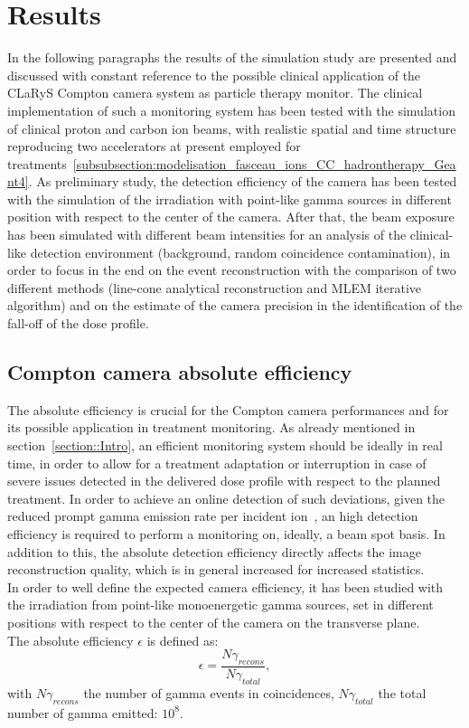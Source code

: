 \section{Results}
In the following paragraphs the results of the simulation study are presented and discussed with constant reference to the possible clinical application of the CLaRyS Compton camera system as particle therapy monitor. The clinical implementation of such a monitoring system has been tested with the simulation of clinical proton and carbon ion beams, with realistic spatial and time structure reproducing two accelerators at present employed for treatments~\ref{subsubsection:modelisation_fasceau_ions_CC_hadrontherapy_Geant4}. As preliminary study, the detection efficiency of the camera has been tested with the simulation of the irradiation with point-like gamma sources in different position with respect to the center of the camera. After that, the beam exposure has been simulated with different beam intensities for an analysis of the clinical-like detection environment (background, random coincidence contamination), in order to focus in the end on the event reconstruction with the comparison of two different methods (line-cone analytical reconstruction and MLEM iterative algorithm) and on the estimate of the camera precision in the identification of the fall-off of the dose profile.


\subsection{Compton camera absolute efficiency}
\label{Results::efficiency}

The absolute efficiency is crucial for the Compton camera performances and for its possible application in treatment monitoring. As already mentioned in section~\ref{section::Intro}, an efficient monitoring system should be ideally in real time, in order to allow for a treatment adaptation or interruption in case of severe issues detected in the delivered dose profile with respect to the planned treatment. In order to achieve an online detection of such deviations, given the reduced prompt gamma emission rate per incident ion~\cite{Ortega:2015aa}, an high detection efficiency is required to perform a monitoring on, ideally, a beam spot basis. In addition to this, the absolute detection efficiency directly affects the image reconstruction quality, which is in general increased for increased statistics.\\
In order to well define the expected camera efficiency, it has been studied with the irradiation from point-like monoenergetic gamma sources, set in different positions with respect to the center of the camera on the transverse plane.	\\
The absolute efficiency $\epsilon$ is defined as:
\begin{equation}
\epsilon =\frac{N\gamma_{recons}}{N\gamma_{total}},
\end{equation}
\label{eq:equation_efficacite_absolue}
with $N\gamma_{recons}$ the number of gamma events in coincidences,\newline
\hspace*{1cm}$N\gamma_{total}$ the total number of gamma emitted: $10^8$.\newline

